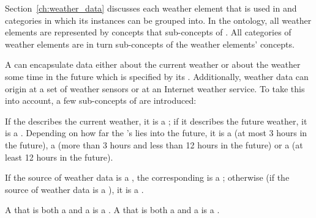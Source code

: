 Section~\ref{ch:weather_data} discusses each weather element that is used in \thinkhomeweather and categories in which its instances can be grouped into. In the ontology, all weather elements are represented by concepts that sub-concepts of . All categories of weather elements are in turn sub-concepts of the weather elements' concepts.

A  can encapsulate data either about the current weather or about the weather some time in the future which is specified by its . Additionally, weather data can origin at a set of weather sensors or at an Internet weather service. To take this into account, a few sub-concepts of  are introduced:

If the  describes the current weather, it is a ; if it describes the future weather, it is a . Depending on how far the 's  lies into the future, it is a  (at most 3 hours in the future), a  (more than 3 hours and less than 12 hours in the future) or a  (at least 12 hours in the future). %

If the source of weather data is a , the corresponding  is a ; otherwise (if the source of weather data is a ), it is a .

A  that is both a  and a  is a . A  that is both a  and a  is a .


